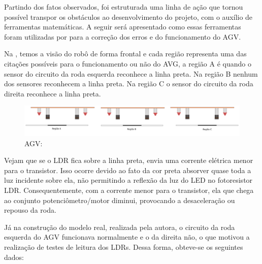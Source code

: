 \documentclass[portuguese]{textolivre}
\begin{document}
Partindo dos fatos observados, foi estruturada uma linha de ação que tornou possível transpor os obstáculos ao desenvolvimento do projeto, com o auxílio de ferramentas matemáticas. A seguir será apresentado como essas ferramentas foram utilizadas por \textcite{AlvesMonica2022} para a correção dos erros e do funcionamento do AGV.

Na , temos a visão do robô de forma frontal e cada região representa uma das citações possíveis para o funcionamento ou não do AVG, a região A é quando o sensor do circuito da roda esquerda reconhece a linha preta. Na região B nenhum dos sensores reconhecem a linha preta. Na região C o sensor do circuito da roda direita reconhece a linha preta.

\begin{figure}[htbp]
\centering
\begin{minipage}{0.99\textwidth}
 \includegraphics[width=\textwidth]{figuras/figura 4.png}
 \caption{AGV:}
 \label{figura04}
\end{minipage}
\end{figure}

Vejam que se o LDR fica sobre a linha preta, envia uma corrente elétrica menor para o transistor. Isso ocorre devido ao fato da cor preta absorver quase toda a luz incidente sobre ela, não permitindo a reflexão da luz do LED no fotoresistor LDR. Consequentemente, com a corrente menor para o transistor, ela que chega ao conjunto potenciômetro/motor diminui, provocando a desaceleração ou repouso da roda.

Já na construção do modelo real, realizada pela autora, o circuito da roda esquerda do AGV funcionava normalmente e o da direita não, o que motivou a realização de testes de leitura dos LDRs. Dessa forma, obteve-se os seguintes dados:
\end{document}
